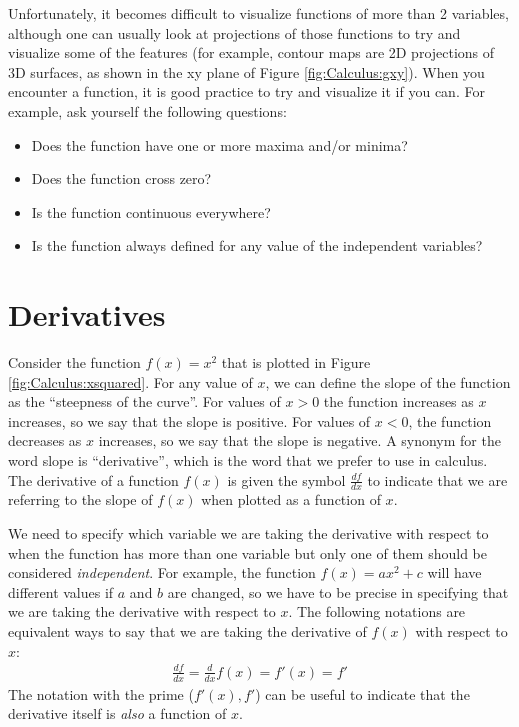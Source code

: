 Unfortunately, it becomes difficult to visualize functions of more than 2 variables, although one can usually look at projections of those functions to try and visualize some of the features (for example, contour maps are 2D projections of 3D surfaces, as shown in the xy plane of Figure \ref{fig:Calculus:gxy}). When you encounter a function, it is good practice to try and visualize it if you can. For example, ask yourself the following questions:
\begin{itemize}
\item Does the function have one or more maxima and/or minima?
\item Does the function cross zero?
\item Is the function continuous everywhere?
\item Is the function always defined for any value of the independent variables?
\end{itemize} 

\section{Derivatives}
Consider the function $f(x)=x^2$ that is plotted in Figure \ref{fig:Calculus:xsquared}. For any value of $x$, we can define the slope of the function as the ``steepness of the curve''. For values of $x>0$ the function increases as $x$ increases, so we say that the slope is positive. For values of $x<0$, the function decreases as $x$ increases, so we say that the slope is negative. A synonym for the word slope is ``derivative'', which is the word that we prefer to use in calculus. The derivative of a function $f(x)$ is given the symbol $\frac{df}{dx}$ to indicate that we are referring to the slope of $f(x)$ when plotted as a function of $x$. 

We need to specify which variable we are taking the derivative with respect to when the function has more than one variable but only one of them should be considered \textit{independent}. For example, the function $f(x)=ax^2+c$ will have different values if $a$ and $b$ are changed, so we have to be precise in specifying that we are taking the derivative with respect to $x$. The following notations are equivalent ways to say that we are taking the derivative of $f(x)$ with respect to $x$:
\begin{align*}
\frac{df}{dx}=\frac{d}{dx} f(x) = f'(x) = f'
\end{align*}
The notation with the prime ($f'(x),f'$) can be useful to indicate that the derivative itself is \textit{also} a function of $x$. 

